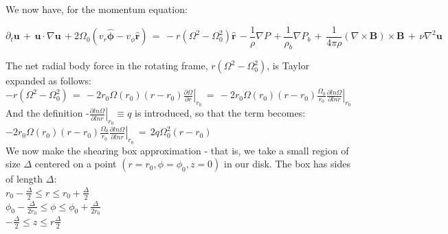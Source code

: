 \documentclass[letterpaper,12pt]{article}
\begin{document}


We now have, for the momentum equation: 

\begin{equation}
\partial_t \mathbf{u} \, + \, \mathbf{u} \cdot \nabla \mathbf{u} \, + 2\Omega_0\left(v_r \mathbf{\hat{\phi}} - v_{\phi}\mathbf{\hat{r}}\right) \, = \, - r\left(\Omega^2 - \Omega_0^2\right)\mathbf{\hat{r}} \, -\frac{1}{\rho}\nabla P \, +\frac{1}{\rho_b}\nabla P_b \,  + \, \frac{1}{4 \pi \rho} \left( \nabla \times \mathbf{B} \right) \times \mathbf{B}  \, + \, \nu\nabla^2 \mathbf{u} \,
\end{equation}

The net radial body force in the rotating frame, $r\left(\Omega^2 - \Omega_0^2\right)$, is Taylor expanded as follows: \\

$-r\left(\Omega^2 - \Omega_0^2\right) \,= \,-2 r_0 \Omega\left(r_0\right)\left(r - r_0\right)\left.\frac{\partial \Omega}{\partial r}\right|_{r_0} \,= \, -2 r_0 \Omega\left(r_0\right)\left(r - r_0\right)\frac{\Omega_0}{r_0} \left.\frac{\partial ln \Omega}{\partial ln r}\right|_{r_0} $ \\

And the definition -$\left.\frac{\partial ln \Omega}{\partial ln r}\right|_{r_0} \equiv q$ is introduced, so that the term becomes: \\

$-2 r_0 \Omega\left(r_0\right)\left(r - r_0\right)\frac{\Omega_0}{r_0} \left.\frac{\partial ln \Omega}{\partial ln r}\right|_{r_0} \, = \, 2q\Omega_0^2\left(r - r_0\right)$ \\

We now make the shearing box approximation \-- that is, we take a small region of size $\Delta$ centered on a point $\left(r = r_0, \phi = \phi_0, z=0\right)$ in our disk. The box has sides of length $\Delta$: \\

\noindent$r_0 - \frac{\Delta}{2} \le r \le r_0 + \frac{\Delta}{2}$ \\
$\phi_0 - \frac{\Delta}{2 r_0} \le \phi \le \phi_0 + \frac{\Delta}{2 r_0}$ \\
$ - \frac{\Delta}{2} \le z \le r \frac{\Delta}{2}$ \\
\end{document}
